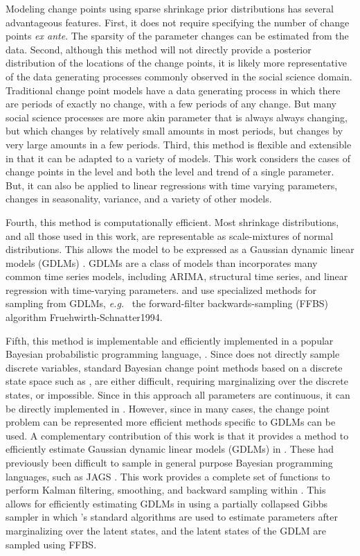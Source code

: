 \documentclass[12pt]{article}
\newcommand{\eg}{\textit{e.g.}\ }
\begin{document}
Modeling change points using sparse shrinkage prior distributions has several advantageous features.
First, it does not require specifying the number of change points \textit{ex ante}.
The sparsity of the parameter changes can be estimated from the data.
Second, although this method will not directly provide a posterior distribution of the locations of the change points, it is likely more representative of the data generating processes commonly observed in the social science domain.
Traditional change point models have a data generating process in which there are periods of exactly no change, with a few periods of any change.
But many social science processes are more akin parameter that is always always changing, but which changes by relatively small amounts in most periods, but changes by very large amounts in a few periods.
Third, this method is flexible and extensible in that it can be adapted to a variety of models.
This work considers the cases of change points in the level and both the level and trend of a single parameter.
But, it can also be applied to linear regressions with time varying parameters, changes in seasonality, variance, and a variety of other models.

Fourth, this method is computationally efficient.
Most shrinkage distributions, and all those used in this work, are representable as scale-mixtures of normal distributions.
This allows the model to be expressed as a Gaussian dynamic linear models (GDLMs) \parencite{WestHarrison1997}.
GDLMs are a class of models than incorporates many common time series models, including ARIMA, structural time series, and linear regression with time-varying parameters.
and use specialized methods for sampling from GDLMs, \eg{} the forward-filter backwards-sampling (FFBS) algorithm \parencite{CarterKohn1994}{Fruehwirth-Schnatter1994}.

Fifth, this method is implementable and efficiently implemented in a popular Bayesian probabilistic programming language, \Stan{}.
Since \Stan{} does not directly sample discrete variables, standard Bayesian change point methods based on a discrete state space such as \parencite{Chib1998}, are either difficult, requiring marginalizing over the discrete states, or impossible.
Since in this approach all parameters are continuous, it can be directly implemented in \Stan{}.
However, since in many cases, the change point problem can be represented more efficient methods specific to GDLMs can be used.
A complementary contribution of this work is that it provides a method to efficiently estimate Gaussian dynamic linear models (GDLMs) in \Stan{}.
These had previously been difficult to sample in general purpose Bayesian programming languages, such as JAGS \parencite[477]{Jackman2009}.
This work provides a complete set of functions to perform Kalman filtering, smoothing, and backward sampling within \Stan{}.
This allows for efficiently estimating GDLMs in \Stan{} using a partially collapsed Gibbs sampler in which \Stan{}'s standard algorithms are used to estimate parameters after marginalizing over the latent states, and the latent states of the GDLM are sampled using FFBS.
\end{document}
